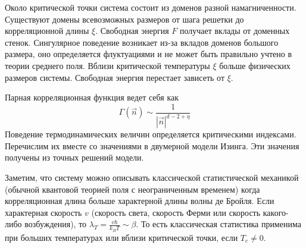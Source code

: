 \documentclass[a4paper,12pt]{article}
\theoremstyle{definition}
\theoremstyle{definition}
\theoremstyle{definition}
\begin{document}
Около критической точки система состоит из доменов разной намагниченности. Существуют домены всевозможных размеров от шага решетки до корреляционной длины $\xi$. Свободная энергия $F$ получает вклады от доменных стенок. Сингулярное поведение возникает из-за вкладов доменов большого размера, оно определяется флуктуациями и не может быть правильно учтено в теории среднего поля. Вблизи критической температуры $\xi$ больше физических размеров системы. Свободная энергия перестает зависеть от $\xi$. 

Парная корреляционная функция ведет себя как
\begin{equation}
  \label{eq:32}
  \Gamma(\vec n)\sim \frac{1}{\left|\vec n\right|^{d-2+\eta}}
\end{equation}
Поведение термодинамических величин определяется критическими индексами. Перечислим их вместе со значениями в двумерной модели Изинга. Эти значения получены из точных решений модели.
\begin{table}[h!tb]
\label{tab:diagrams}
\noindent  {}
\end{table}

Заметим, что систему можно описывать классической статистической механикой (обычной квантовой теорией поля с неограниченным временем) когда корреляционная длина больше характерной длины волны де Бройля. Если характерная скорость $v$ (скорость света, скорость Ферми или скорость какого-либо возбуждения), то $\lambda_T=\frac{v\hbar}{k_B T}\sim \beta$. То есть классическая статистика применима при больших температурах или вблизи критической точки, если $T_c\neq 0$.
\end{document}
